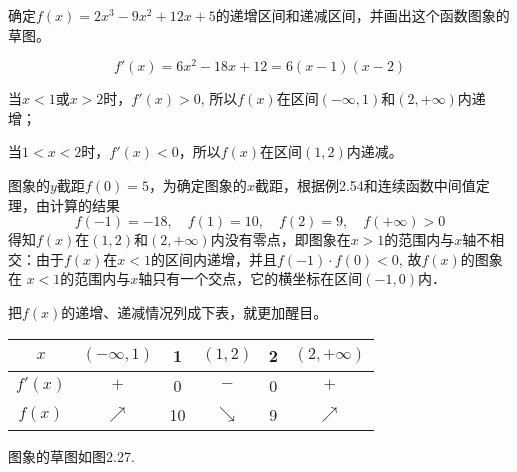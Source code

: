 \begin{example}
    确定$f(x)=2x^3-9x^2+12x+5$的递增区间和递减区间，并画出这个函数图象的草图。
\end{example}


\begin{solution}
  \[  f'(x)=6x^2-18x+12=6(x-1)(x-2)\]

  当$x<1$或$x>2$时，$f'(x)>0$, 所以$f(x)$在区间$(-\infty,1)$和$(2,+\infty)$内递增；

  当$1<x<2$时，$f'(x)<0$，所以$f(x)$在区间$(1,2)$内递减。
  
  图象的$y$截距$f(0)=5$，为确定图象的$x$截距，根据例2.54和连续函数中间值定理，由计算的结果
  \[f(-1)=-18,\quad f(1)=10,\quad f(2)=9,\quad f(+\infty)>0\]
  得知$f(x)$在$(1, 2)$和$(2,+\infty)$内没有零点，即图象在$x>1$的范围内与$x$轴不相交：由于$f(x)$在$x<1$的区间内递增，并且$f(-1)\cdot f(0)<0$, 故$f(x)$的图象在
  $x<1$的范围内与$x$轴只有一个交点，它的横坐标在区间$(-1,0)$内．

  把$f(x)$的递增、递减情况列成下表，就更加醒目。

  \begin{center}
\begin{tabular}{c|ccccc}
\hline
$x$ & $(-\infty,1)$& 1& $(1,2)$ & 2& $(2,+\infty)$\\
\hline
$f'(x)$ & $+$ &0&$-$&0&$+$\\
$f(x)$ & $\nearrow$ &10&$\searrow$ &9&$\nearrow$ \\
\hline
\end{tabular}
  \end{center}
图象的草图如图2.27.

\begin{figure}[htp]
    \centering
{}
    \caption{}
\end{figure}
\end{solution}

